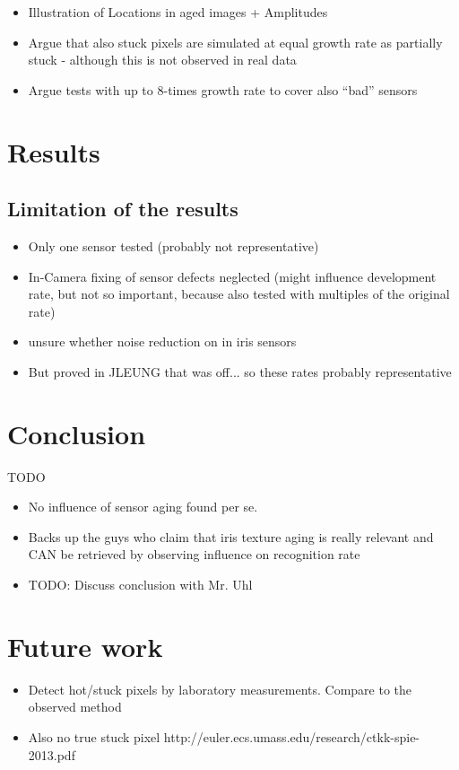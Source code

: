 \documentclass[10pt,twocolumn,letterpaper]{article}
\begin{document}
 
 
 \begin{itemize}
 \item Illustration of Locations in aged images + Amplitudes
 \item Argue that also stuck pixels are simulated at equal growth rate as partially stuck - although this is not observed in real data
 \item Argue tests with up to 8-times growth rate to cover also ``bad'' sensors
\end{itemize}
 
 
 \section{Results}
 \label{results}
 \subsection{Limitation of the results}
 \begin{itemize}
  \item Only one sensor tested (probably not representative)
  \item In-Camera fixing of sensor defects neglected (might influence development rate, but not so important, because also tested with multiples of the original rate)
  \item unsure whether noise reduction on in iris sensors
  \item But proved in JLEUNG that was off... so these rates probably representative
 \end{itemize}
 
 \section{Conclusion}
 \label{conclusion}
 TODO
 \begin{itemize}
  \item No influence of sensor aging found per se.
  \item Backs up the guys who claim that iris texture aging is really relevant and CAN be retrieved by observing influence on recognition rate
  \item TODO: Discuss conclusion with Mr. Uhl 
 \end{itemize}

 \section{Future work}
 \begin{itemize}
  \item Detect hot/stuck pixels by laboratory measurements. Compare to the observed method
  \item Also no true stuck pixel http://euler.ecs.umass.edu/research/ctkk-spie-2013.pdf
 \end{itemize}



{\small


}
\end{document}
